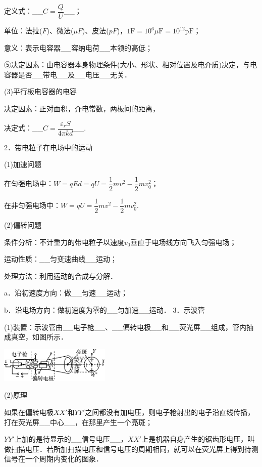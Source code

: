 定义式：\_\_$C=\dfrac{Q}{U}$\_\_；

单位：法拉($F$)、微法($\mu F$)、皮法($pF$)，$1 \mathrm{F}=10^{6} \mu \mathrm{F}=10^{12} \mathrm{pF}$；

意义：表示电容器\_\_容纳电荷\_\_本领的高低；

⑤决定因素：由电容器本身物理条件(大小、形状、相对位置及电介质)决定，与电容器是否\_\_带电\_\_及\_\_电压\_\_无关．

(3)平行板电容器的电容

决定因素：正对面积，介电常数，两板间的距离，

决定式：\_\_$C=\dfrac{\varepsilon_{r} S}{4 \pi k d}$\_\_.

2．带电粒子在电场中的运动

(1)加速问题

在匀强电场中：$W=q E d=q U=\dfrac{1}{2} m v^{2}-\dfrac{1}{2} m v_{0}^2$；

在非匀强电场中：$W=q U=\dfrac{1}{2} m v^{2}-\dfrac{1}{2} m v_{0}^2$.

(2)偏转问题

条件分析：不计重力的带电粒子以速度$v_0$垂直于电场线方向飞入匀强电场；

运动性质：\_\_匀变速曲线\_\_运动；

处理方法：利用运动的合成与分解．

a．沿初速度方向：做\_\_匀速\_\_运动；

b．沿电场方向：做初速度为零的\_\_匀加速\_\_运动．
3．示波管

(1)装置：示波管由\_\_电子枪\_\_、\_\_偏转电极\_\_和\_\_荧光屏\_\_组成，管内抽成真空，如图所示．

\begin{center}\includegraphics[width=2.08333in,height=0.65625in]{media/image292.png}\end{center}

(2)原理

如果在偏转电极$XX'$和$YY'$之间都没有加电压，则电子枪射出的电子沿直线传播，打在荧光屏\_\_中心\_\_，在那里产生一个亮斑；

$YY'$上加的是待显示的\_\_信号电压\_\_，$XX'$上是机器自身产生的锯齿形电压，叫做扫描电压．若所加扫描电压和信号电压的周期相同，就可以在荧光屏上得到待测信号在一个周期内变化的图象．

